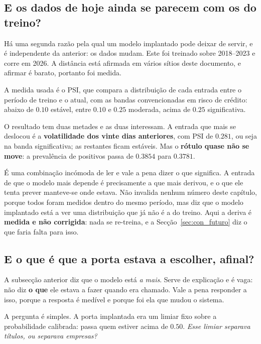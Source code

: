 \subsection{E os dados de hoje ainda se parecem com os do treino?}
\label{sec:av_deriva}

Há uma segunda razão pela qual um modelo implantado pode deixar de servir, e é independente da
anterior: os dados mudam. Este foi treinado sobre 2018--2023 e corre em 2026. A distância está
afirmada em vários sítios deste documento, e afirmar é barato, portanto foi medida.

A medida usada é o \gls{PSI}, que compara a distribuição de cada entrada entre o período de treino
e o atual, com as bandas convencionadas em risco de crédito: abaixo de $0.10$ estável, entre
$0.10$ e $0.25$ moderada, acima de $0.25$ significativa.

O resultado tem duas metades e as duas interessam. A entrada que mais se deslocou é a
\textbf{volatilidade dos vinte dias anteriores}, com \gls{PSI} de $0.281$, ou seja na banda
significativa; as restantes ficam estáveis. Mas o \textbf{rótulo quase não se move}: a prevalência
de positivos passa de $0.3854$ para $0.3781$.

É uma combinação incómoda de ler e vale a pena dizer o que significa. A entrada de que o modelo mais
depende é precisamente a que mais derivou, e o que ele tenta prever manteve-se onde estava. Não
invalida nenhum número deste capítulo, porque todos foram medidos dentro do mesmo período, mas
diz que o modelo implantado está a ver uma distribuição que já não é a do treino. Aqui a deriva é
\textbf{medida e não corrigida}: nada se re-treina, e a Secção~\ref{sec:con_futuro} diz o que
faria falta para isso.

\subsection{E o que é que a porta estava a escolher, afinal?}
\label{sec:av_portao}

A subsecção anterior diz que o modelo está \emph{a mais}. Serve de explicação e é vaga: não
diz \textbf{o que} ele estava a fazer quando era chamado. Vale a pena responder a isso, porque a
resposta é medível e porque foi ela que mudou o sistema.

A pergunta é simples. A porta implantada era um limiar fixo sobre a probabilidade calibrada: passa
quem estiver acima de $0.50$. \emph{Esse limiar separava títulos, ou separava empresas?}

